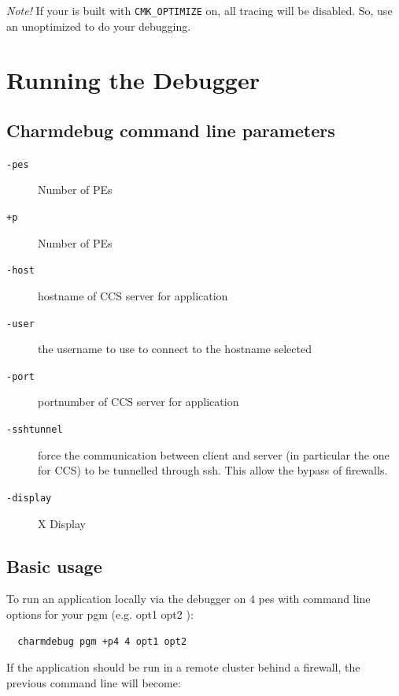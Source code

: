\documentclass[10pt]{article}
\begin{document}
\emph{ Note! } If your \charmpp{} is built with {\tt CMK\_OPTIMIZE} on,
all tracing will be disabled. So, use an unoptimized \charmpp{} to do your
debugging.

\section{Running the Debugger}

\subsection{Charmdebug command line parameters}

\begin{description}

\item[{\tt -pes}] Number of PEs 

\item[{\tt +p}] Number of PEs 

\item[{\tt -host}] hostname of CCS server for application

\item[{\tt -user}] the username to use to connect to the hostname selected

\item[{\tt -port}] portnumber of CCS server for application

\item[{\tt -sshtunnel}] force the communication between client and server
(in particular the one for CCS) to be tunnelled through ssh. This allow the
bypass of firewalls.

\item[{\tt -display}] X Display

\end{description}

\subsection{Basic usage}

To run an application locally via the debugger on 4 pes with command line options for your pgm (e.g. opt1 opt2 ):

\begin{verbatim}
  charmdebug pgm +p4 4 opt1 opt2
\end{verbatim}

If the application should be run in a remote cluster behind a firewall, the previous command line will become:
\end{document}

